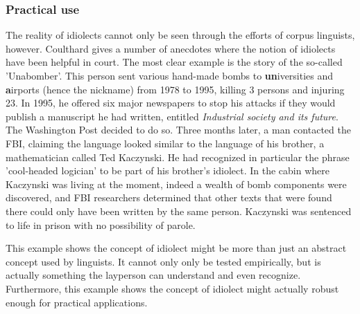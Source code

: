 \documentclass[11pt]{article}
\begin{document}
\subsubsection{Practical use}
The reality of idiolects cannot only be seen through the efforts of corpus linguists, however. Coulthard  gives a number of anecdotes where the notion of idiolects have been helpful in court. The most clear example is the story of the so-called 'Unabomber'. This person sent various hand-made bombs to \textbf{un}iversities and \textbf{a}irports (hence the nickname) from 1978 to 1995, killing 3 persons and injuring 23. In 1995, he offered six major newspapers to stop his attacks if they would publish a manuscript he had written, entitled \emph{Industrial society and its future}. The Washington Post decided to do so. Three months later, a man contacted the FBI, claiming the language looked similar to the language of his brother, a mathematician called Ted Kaczynski. He had recognized in particular the phrase 'cool-headed logician' to be part of his brother's idiolect. In the cabin where Kaczynski was living at the moment, indeed a wealth of bomb components were discovered, and FBI researchers determined that other texts that were found there could only have been written by the same person. Kaczynski was sentenced to life in prison with no possibility of parole. 

This example shows the concept of idiolect might be more than just an abstract concept used by linguists. It cannot only only be tested empirically, but is actually something the layperson can understand and even recognize. Furthermore, this example shows the concept of idiolect might actually robust enough for practical applications.
\end{document}
